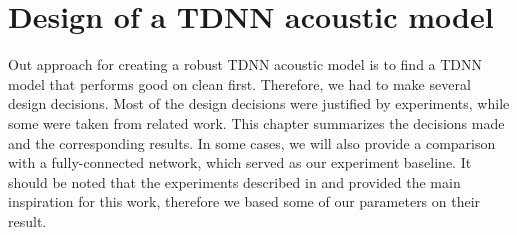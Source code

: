 

\chapter{Design of a TDNN acoustic model}
\label{ch:tdnn_design}
Out approach for creating a robust TDNN acoustic model is to find a TDNN model that performs good on clean first. Therefore, we had to make several design decisions. Most of the design decisions were justified by experiments, while some were taken from related work. This chapter summarizes the decisions made and the corresponding results. In some cases, we will also provide a comparison with a fully-connected network, which served as our experiment baseline. It should be noted that the experiments described in \cite{peddinti2015jhu} and \cite{peddinti2015reverberation} provided the main inspiration for this work, therefore we based some of our parameters on their result.
